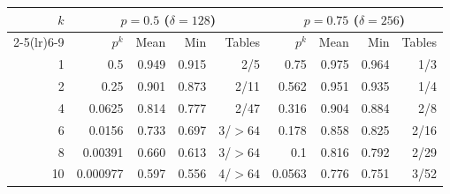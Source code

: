 \begin{tabular}{rrrrrrrrr}
\toprule
$k$ & \multicolumn{4}{c}{$p=0.5$ ($\delta=128$)} & \multicolumn{4}{c}{$p=0.75$ ($\delta=256$)}\\
\cmidrule(lr){2-5}\cmidrule(lr){6-9}
 & $p^k$ & Mean & Min & Tables & $p^k$ & Mean & Min & Tables\\
\midrule
1 & 0.5 & 0.949 & 0.915 & 2/5 & 0.75 & 0.975 & 0.964 & 1/3\\
2 & 0.25 & 0.901 & 0.873 & 2/11 & 0.562 & 0.951 & 0.935 & 1/4\\
4 & 0.0625 & 0.814 & 0.777 & 2/47 & 0.316 & 0.904 & 0.884 & 2/8\\
6 & 0.0156 & 0.733 & 0.697 & 3/$>64$ & 0.178 & 0.858 & 0.825 & 2/16\\
8 & 0.00391 & 0.660 & 0.613 & 3/$>64$ & 0.1 & 0.816 & 0.792 & 2/29\\
10 & 0.000977 & 0.597 & 0.556 & 4/$>64$ & 0.0563 & 0.776 & 0.751 & 3/52\\
\bottomrule
\end{tabular}
